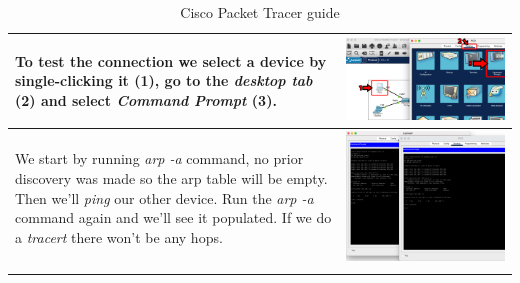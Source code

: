 \documentclass[11pt,a4paper]{report}
\begin{document}
\begin{flushleft}
\begin{center}
\begin{longtable}{ m{5cm} l }
                    To test the connection we select a device by \textbf{single-clicking} it (1), go to the \textit{desktop tab} (2) and select \textit{Command Prompt} (3).                                                                                                                    & \includegraphics[scale=0.35,valign=c]{p1-connectingdevices/CiscoPacketTracer_cmdOutput} \\ \hline
                    We start by running \textit{arp -a} command, no prior discovery was made so the arp table will be empty. Then we'll \textit{ping} our other device. Run the \textit{arp -a} command again and we'll see it populated. If we do a \textit{tracert} there won't be any hops.    & \includegraphics[scale=0.34,valign=c]{p1-connectingdevices/Laptop0PC0_cmd} \\ \hline

                    \caption{Cisco Packet Tracer guide}
                    \label{tab:cptg}
                \end{longtable}
            \end{center}
        \end{flushleft}
\end{document}

